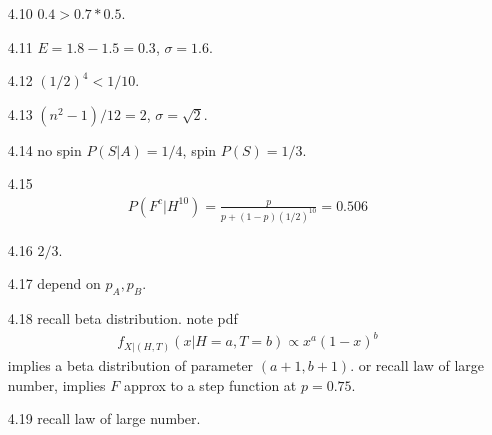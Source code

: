 \documentclass[paper=a4, fontsize=11pt]{scrartcl} %
\numberwithin{equation}{section} %
\numberwithin{figure}{section} %
\numberwithin{table}{section} %
\begin{document}
\begin{itemize}
	\item[4.10] $0.4>0.7*0.5$.
	\item[4.11] $E=1.8-1.5=0.3$, $\sigma = 1.6$.
	\item[4.12] $(1/2)^4 < 1/10$.
	\item[4.13] $(n^2-1)/12 = 2$, $\sigma=\sqrt{2}$.
	\item[4.14] no spin $P(S|A)= 1/4$, spin $P(S)=1/3$.
	\item[4.15]
	\begin{align}
		P(F^c| H^{10}) =  \frac{p}{p + (1-p) (1/2)^{10}}= 0.506
	\end{align}
	\item[4.16] $2/3$.
	\item[4.17] depend on $p_A,p_B$.
	\item[4.18] recall beta distribution. note pdf
	\begin{align}
		f_{X|(H,T)}(x| H=a,T=b) \propto x^a (1-x)^b
	\end{align}
	implies a beta distribution of parameter $(a+1,b+1)$. or recall law of large number, implies $F$ approx to a step function at $p=0.75$.
	\item[4.19] recall law of large number.
\end{itemize}
\end{document}
